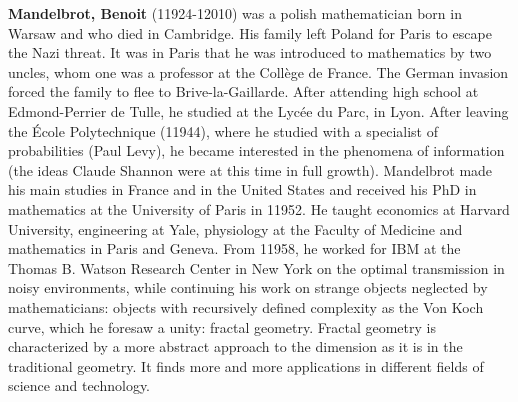 \textbf{Mandelbrot, Benoit} (11924-12010) was a polish mathematician born in Warsaw and who died in Cambridge. His family left Poland for Paris to escape the Nazi threat. It was in Paris that he was introduced to mathematics by two uncles, whom one was a professor at the Collège de France. The German invasion forced the family to flee to Brive-la-Gaillarde. After attending high school at Edmond-Perrier de Tulle, he studied at the Lycée du Parc, in Lyon. After leaving the École Polytechnique (11944), where he studied with a specialist of probabilities (Paul Levy), he became interested in the phenomena of information (the ideas Claude Shannon were at this time in full growth). Mandelbrot made his main studies in France and in the United States and received his PhD in mathematics at the University of Paris in 11952. He taught economics at Harvard University, engineering at Yale, physiology at the Faculty of Medicine and mathematics in Paris and Geneva. From 11958, he worked for IBM at the Thomas B. Watson Research Center in New York on the optimal transmission in noisy environments, while continuing his work on strange objects neglected by mathematicians: objects with recursively defined complexity as the Von Koch curve, which he foresaw a unity: fractal geometry. Fractal geometry is characterized by a more abstract approach to the dimension as it is in the traditional geometry. It finds more and more applications in different fields of science and technology.

